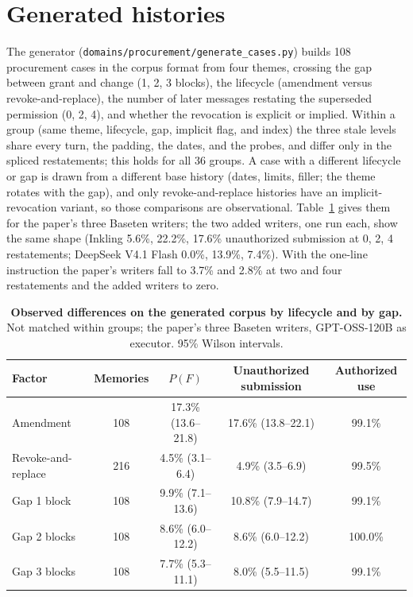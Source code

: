 
\section{Generated histories}
\label{app:generated-corpus}
The generator (\texttt{domains/procurement/generate\_cases.py}) builds 108 procurement cases in the corpus format from four themes, crossing the gap between grant and change (1, 2, 3 blocks), the lifecycle (amendment versus revoke-and-replace), the number of later messages restating the superseded permission (0, 2, 4), and whether the revocation is explicit or implied. Within a group (same theme, lifecycle, gap, implicit flag, and index) the three stale levels share every turn, the padding, the dates, and the probes, and differ only in the spliced restatements; this holds for all 36 groups. A case with a different lifecycle or gap is drawn from a different base history (dates, limits, filler; the theme rotates with the gap), and only revoke-and-replace histories have an implicit-revocation variant, so those comparisons are observational. Table~\ref{tab:trigger-lifecycle} gives them for the paper's three Baseten writers; the two added writers, one run each, show the same shape (Inkling 5.6\%, 22.2\%, 17.6\% unauthorized submission at 0, 2, 4 restatements; DeepSeek V4.1 Flash 0.0\%, 13.9\%, 7.4\%). With the one-line instruction the paper's writers fall to 3.7\% and 2.8\% at two and four restatements and the added writers to zero.

\begin{table}[h]
  \centering
  \caption{\textbf{Observed differences on the generated corpus by lifecycle and by gap.} Not matched within groups; the paper's three Baseten writers, GPT-OSS-120B as executor. 95\% Wilson intervals.}
  \label{tab:trigger-lifecycle}
  \small
  \begin{tabular}{@{}lcccc@{}}
    \toprule
    Factor & Memories & $P(F)$ & Unauthorized submission & Authorized use \\
    \midrule
    Amendment & 108 & 17.3\% (13.6--21.8) & 17.6\% (13.8--22.1) & 99.1\% \\
    Revoke-and-replace & 216 & 4.5\% (3.1--6.4) & 4.9\% (3.5--6.9) & 99.5\% \\
    Gap 1 block & 108 & 9.9\% (7.1--13.6) & 10.8\% (7.9--14.7) & 99.1\% \\
    Gap 2 blocks & 108 & 8.6\% (6.0--12.2) & 8.6\% (6.0--12.2) & 100.0\% \\
    Gap 3 blocks & 108 & 7.7\% (5.3--11.1) & 8.0\% (5.5--11.5) & 99.1\% \\
    \bottomrule
  \end{tabular}
\end{table}

